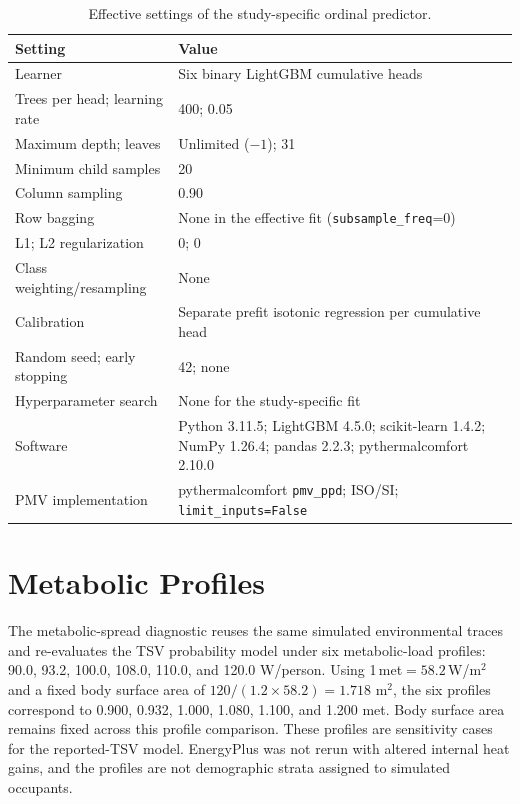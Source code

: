 \documentclass[11pt]{article}
\begin{document}
\begin{table}[htbp]
\centering
\caption{Effective settings of the study-specific ordinal predictor.}
\label{tab:supp_model_settings}
\footnotesize
\begin{tabularx}{\textwidth}{@{}p{}X@{}}
\toprule
Setting & Value \\
\midrule
Learner & Six binary LightGBM cumulative heads \\
Trees per head; learning rate & 400; 0.05 \\
Maximum depth; leaves & Unlimited ($-1$); 31 \\
Minimum child samples & 20 \\
Column sampling & 0.90 \\
Row bagging & None in the effective fit (\texttt{subsample\_freq}=0) \\
L1; L2 regularization & 0; 0 \\
Class weighting/resampling & None \\
Calibration & Separate prefit isotonic regression per cumulative head \\
Random seed; early stopping & 42; none \\
Hyperparameter search & None for the study-specific fit \\
Software & Python 3.11.5; LightGBM 4.5.0; scikit-learn 1.4.2; NumPy 1.26.4; pandas 2.2.3; pythermalcomfort 2.10.0 \\
PMV implementation & pythermalcomfort \texttt{pmv\_ppd}; ISO/SI; \texttt{limit\_inputs=False} \\
\bottomrule
\end{tabularx}
\end{table}

\section{Metabolic Profiles}

The metabolic-spread diagnostic reuses the same simulated environmental traces and re-evaluates the TSV probability model under six metabolic-load profiles: 90.0, 93.2, 100.0, 108.0, 110.0, and 120.0 W/person. Using 1\,met${}=58.2$\,W/m$^2$ and a fixed body surface area of \(120/(1.2\times58.2)=1.718\) m$^2$, the six profiles correspond to 0.900, 0.932, 1.000, 1.080, 1.100, and 1.200 met. Body surface area remains fixed across this profile comparison. These profiles are sensitivity cases for the reported-TSV model. EnergyPlus was not rerun with altered internal heat gains, and the profiles are not demographic strata assigned to simulated occupants.
\end{document}
